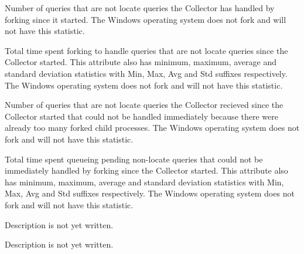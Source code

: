\begin{description}
\item[\AdAttr{HandleQueryForked}:] Number of queries that are not locate queries the Collector has handled by forking since it started.
The Windows operating system does not fork and will not have this statistic.

\item[\AdAttr{HandleQueryForkedRuntime}:] Total time spent forking to handle queries that are not locate queries since the Collector started.
This attribute also has minimum, maximum, average and standard deviation statistics with Min, Max, Avg and Std suffixes respectively.
The Windows operating system does not fork and will not have this statistic.

\item[\AdAttr{HandleQueryMissedFork}:] Number of queries that are not locate queries the Collector 
recieved since the Collector started that could not be handled immediately because there were already too many forked child processes.
The Windows operating system does not fork and will not have this statistic.

\item[\AdAttr{HandleQueryMissedForkRuntime}:] Total time spent queueing pending non-locate queries that could not be immediately handled by forking since the Collector started. 
This attribute also has minimum, maximum, average and standard deviation statistics with Min, Max, Avg and Std suffixes respectively.
The Windows operating system does not fork and will not have this statistic.

\item[\AdAttr{HostsClaimed}:] Description is not yet written.

\item[\AdAttr{HostsOwner}:] Description is not yet written.


\end{description}
